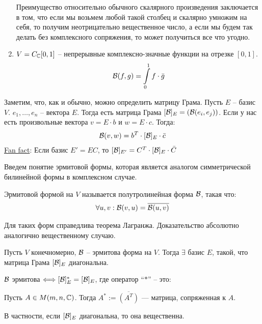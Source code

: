 \begin{conj}
\begin{enumerate}
        Преимущество относительно обычного скалярного произведения заключается в том, что если мы возьмем любой такой столбец и
        скалярно умножим на себя, то получим неотрицательно вещественное число, а если мы будем так делать без комплексного 
        сопряжения, то может получиться все что угодно.

        \item $V = C_{\mathbb{C}} [0, 1]$ -- непрерывные комплексно-значные функции на отрезке $[0, 1]$.
        \begin{gather*}
            \mathcal{B}(f, g) = \int\limits_0^1 f \cdot \bar{g}
        \end{gather*}
    \end{enumerate}    
\end{conj}

Заметим, что, как и обычно, можно определить матрицу Грама. 
Пусть $E$ -- базис $V$. $e_1, \dots, e_n$ -- вектора $E$. Тогда есть матрица Грама $[\mathcal{B}]_E = (\mathcal{B}(e_i, e_j))$. 
Если у нас есть произвольные вектора $v = E \cdot b$ и $w = E \cdot c$. Тогда: 
\begin{gather*}
    \mathcal{B}(v, w) = b^T \cdot [\mathcal{B}]_E \cdot \bar{c}
\end{gather*}
\underline{Fan fact}:
Если базис $E' = EC$, то $[\mathcal{B}]_{E'} = C^T \cdot [\mathcal{B}]_{E} \cdot \bar{C}$

Введем понятие эрмитовой формы, которая является аналогом симметрической билинейной формы в комплексном случае. 
\begin{conj}
    Эрмитовой формой на $V$ называется полутролинейная форма $\mathcal{B}$, такая что:  
    \begin{gather*}
        \forall u, v: \mathcal{B}(v, u) = \overline{\mathcal{B}(u, v)}
    \end{gather*}
\end{conj}
Для таких форм справедлива теорема Лагранжа. Доказательство абсолютно аналогично вещественному случаю. 
\begin{theorem}
    Пусть $V$ конечномерно, $\mathcal{B}$ --  эрмитова форма на $V$. Тогда $\exists$ базис $E$, такой, что матрица Грама $[\mathcal{B}]_E$ диагональна.
\end{theorem}

\notice $\mathcal{B}$ эрмитова $\Longleftrightarrow [\mathcal{B}]^*_E  = [\mathcal{B}]_E$, где оператор ``$*$'' -- это: 
\begin{conj}
    Пусть $A \in M(m, n, \mathbb{C})$. Тогда $A^* := \overline{(A^T)}$ --- матрица, сопряженная к $A$.
\end{conj}
В частности, если $[\mathcal{B}]_E$ диагональна, то она вещественна.

